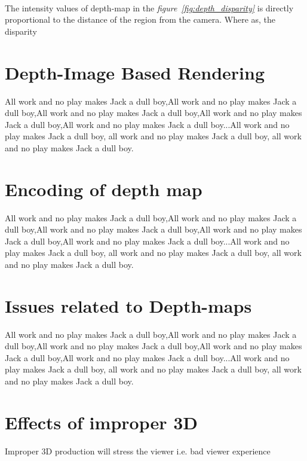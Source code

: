 \paragraph{}
The intensity values of depth-map in the \textit{figure~\ref{fig:depth_disparity}} is directly proportional to the distance of the region from the camera. Where as, the disparity 
	
\section{Depth-Image Based Rendering}
All work and no play makes Jack a dull boy,All work and no play makes Jack a dull boy,All work and no play makes Jack a dull boy,All work and no play makes Jack a dull boy,All work and no play makes Jack a dull boy...All work and no play makes Jack a dull boy, all work and no play makes Jack a dull boy, all work and no play makes Jack a dull boy.

\section{Encoding of depth map}
All work and no play makes Jack a dull boy,All work and no play makes Jack a dull boy,All work and no play makes Jack a dull boy,All work and no play makes Jack a dull boy,All work and no play makes Jack a dull boy...All work and no play makes Jack a dull boy, all work and no play makes Jack a dull boy, all work and no play makes Jack a dull boy.

\section{Issues related to Depth-maps}
All work and no play makes Jack a dull boy,All work and no play makes Jack a dull boy,All work and no play makes Jack a dull boy,All work and no play makes Jack a dull boy,All work and no play makes Jack a dull boy...All work and no play makes Jack a dull boy, all work and no play makes Jack a dull boy, all work and no play makes Jack a dull boy.


\section{Effects of improper 3D}
Improper 3D production will stress the viewer i.e. bad viewer experience 

